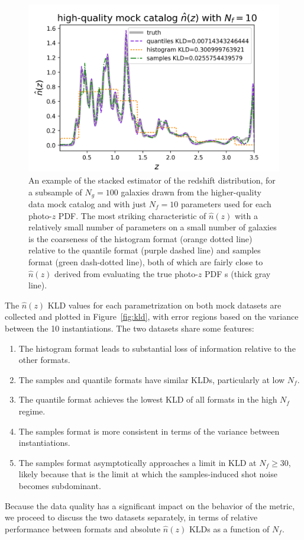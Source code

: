 \documentclass[\docopts]{\docclass}
\newcommand{\pz}{photo-$z$ PDF\xspace}
\begin{document}
\begin{figure}
  \includegraphics[width=0.9\columnwidth]{figures/stacked.png}
  \caption{An example of the stacked estimator of the redshift distribution, 
for a subsample of $N_{g}=100$ galaxies drawn from the higher-quality data mock 
catalog and with just $N_{f}=10$ parameters used for each \pz.
  The most striking characteristic of $\hat{n}(z)$ with a relatively small 
number of parameters on a small number of galaxies is the coarseness of the 
histogram format (orange dotted line) relative to the quantile format (purple 
dashed line) and samples format (green dash-dotted line), both of which are 
fairly close to $\hat{n}(z)$ derived from evaluating the true \pz s (thick gray 
line).
  \label{fig:stacked}}
\end{figure}

The $\hat{n}(z)$ KLD values for each parametrization on both mock datasets are 
collected and plotted in Figure~\ref{fig:kld}, with error regions based on the 
variance between the 10 instantiations.
The two datasets share some features:
\begin{enumerate}
\item The histogram format leads to substantial loss of information relative to 
the other formats.
\item The samples and quantile formats have similar KLDs, particularly at low 
$N_{f}$.
\item The quantile format achieves the lowest KLD of all formats in the high 
$N_{f}$ regime.
\item The samples format is more consistent in terms of the variance between 
instantiations.
\item The samples format asymptotically approaches a limit in KLD at 
$N_{f}\geq30$, likely because that is the limit at which the samples-induced 
shot noise becomes subdominant.
\end{enumerate}
Because the data quality has a significant impact on the behavior of the 
metric, we proceed to discuss the two datasets separately, in terms of relative 
performance between formats and absolute $\hat{n}(z)$ KLDs as a function of 
$N_{f}$.
\end{document}
